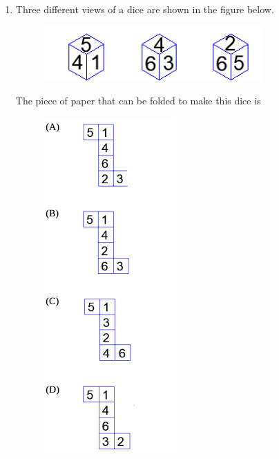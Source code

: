 \documentclass[journal,12pt,onecolumn]{IEEEtran}
\theoremstyle{remark}
\begin{document}
\begin{enumerate}
At the end of one year, the total amount that Person 1 gets is  more than Person 2. The annual rate of return for the mutual funds B and C is 15\% each. What is the annual rate of return for the mutual fund A?

\begin{multicols}{4}
\begin{enumerate}
    \item 7.5\%
    \item 10\%
    \item 15\%
    \item 20\%
\end{enumerate}
\end{multicols}

\hfill (GATE PI 2025)

\item Three different views of a dice are shown in the figure below.

\begin{figure}[H]
\centering
\includegraphics[width=0.5\columnwidth]{fig2.png}
\caption{}
\end{figure}

The piece of paper that can be folded to make this dice is

\begin{figure}[H]
\includegraphics[width=0.3\columnwidth]{fig3.png}
\caption{}
\end{figure}



\end{enumerate}
\end{document}

